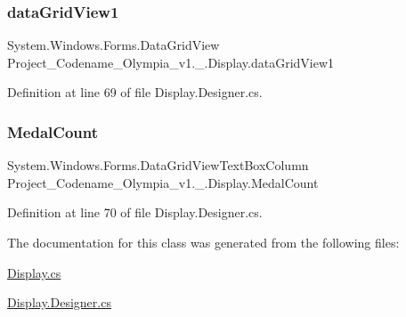 \subsubsection{\texorpdfstring{data\+Grid\+View1}{dataGridView1}}
{\footnotesize\ttfamily System.\+Windows.\+Forms.\+Data\+Grid\+View Project\+\_\+\+Codename\+\_\+\+Olympia\+\_\+v1.\+\_.\+Display.\+data\+Grid\+View1\hspace{0.3cm}{\ttfamily [private]}}



Definition at line 69 of file Display.\+Designer.\+cs.

\mbox{\label{classProject__Codename__Olympia__v1_1_1__0_1_1Display_a8302137e094ab0b4e00fc3f623229292}} 
\subsubsection{\texorpdfstring{Medal\+Count}{MedalCount}}
{\footnotesize\ttfamily System.\+Windows.\+Forms.\+Data\+Grid\+View\+Text\+Box\+Column Project\+\_\+\+Codename\+\_\+\+Olympia\+\_\+v1.\+\_.\+Display.\+Medal\+Count\hspace{0.3cm}{\ttfamily [private]}}



Definition at line 70 of file Display.\+Designer.\+cs.



The documentation for this class was generated from the following files\+:\begin{DoxyCompactItemize}
\item 
\hyperlink{Display_8cs}{Display.\+cs}\item 
\hyperlink{Display_8Designer_8cs}{Display.\+Designer.\+cs}\end{DoxyCompactItemize}
